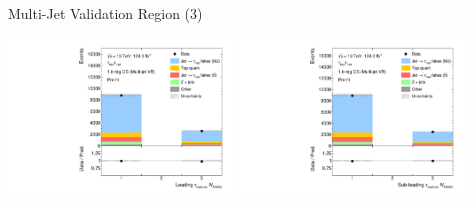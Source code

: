 \documentclass[11pt, xcolor={dvipsnames}, aspectratio=169, notes]{beamer}
\begin{document}

\begin{frame}{Multi-Jet Validation Region (3)}
  \centering

  \includegraphics[width=0.45\textwidth]{fakefactors/fake_os_vr/Tau0Ntrk_fakevr}%
  \hfill%
  \includegraphics[width=0.45\textwidth]{fakefactors/fake_os_vr/Tau1Ntrk_fakevr}
\end{frame}

\end{document}
